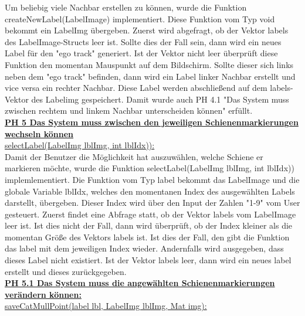 \documentclass[11pt]{scrartcl}
\begin{document}
\noindent
Um beliebig viele Nachbar erstellen zu können, wurde die Funktion createNewLabel(LabelImage) implementiert. Diese Funktion vom Typ void bekommt ein LabelImg übergeben. Zuerst wird abgefragt, ob der Vektor labels des LabelImage-Structs leer ist. Sollte dies der Fall sein, dann wird ein neues Label für den "ego track" generiert. Ist der Vektor nicht leer überprüft diese Funktion den momentan Mauspunkt auf dem Bildschirm. Sollte dieser sich links neben dem "ego track" befinden, dann wird ein Label linker Nachbar erstellt und vice versa ein rechter Nachbar. Diese Label werden abschließend auf dem labels-Vektor des Labelimg gespeichert. Damit wurde auch PH 4.1 "Das System muss zwischen rechtem und linkem Nachbar unterscheiden können" erfüllt.
\\

\noindent
\underline{\textbf {PH 5 Das System muss zwischen den jeweiligen Schienenmarkierungen wechseln können}}
\\

\noindent
\underline{selectLabel(LabelImg lblImg, int lblIdx)):}
\\

\noindent
Damit der Benutzer die Möglichkeit hat auszuwählen, welche Schiene er markieren möchte, wurde die Funktion selectLabel(LabelImg lblImg, int lblIdx)) implemlementiert. Die Funktion vom Typ label bekommt das LabelImage und die globale Variable lblIdx, welches den momentanen Index des ausgewählten Labels darstellt, übergeben. Dieser Index wird über den Input der Zahlen "1-9" vom User gesteuert. Zuerst findet eine Abfrage statt, ob der Vektor labels vom LabelImage leer ist. Ist dies nicht der Fall, dann wird überprüft, ob der Index kleiner als die momentan Größe des Vektors labels ist. Ist dies der Fall, den gibt die Funktion das label mit dem jeweiligen Index wieder. Andernfalls wird ausgegeben, dass dieses Label nicht existiert. Ist der Vektor labels leer, dann wird ein neues label erstellt und dieses zurückgegeben.
\\

\noindent
\underline{\textbf {PH 5.1 Das System muss die angewählten Schienenmarkierungen verändern können:}}
\\

\noindent
\underline{saveCatMullPoint(label lbl, LabelImg lblImg, Mat img):}
\\
\end{document}
